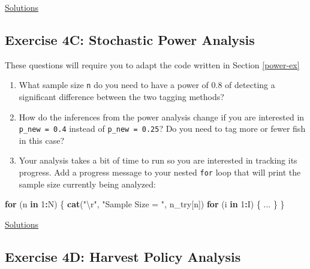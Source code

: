 \documentclass[]{book}
\newenvironment{Shaded}{\begin{snugshade}}{\end{snugshade}}
\newcommand{\KeywordTok}[1]{\textcolor[rgb]{0.13,0.29,0.53}{\textbf{#1}}}
\newcommand{\DecValTok}[1]{\textcolor[rgb]{0.00,0.00,0.81}{#1}}
\newcommand{\CharTok}[1]{\textcolor[rgb]{0.31,0.60,0.02}{#1}}
\newcommand{\StringTok}[1]{\textcolor[rgb]{0.31,0.60,0.02}{#1}}
\newcommand{\ControlFlowTok}[1]{\textcolor[rgb]{0.13,0.29,0.53}{\textbf{#1}}}
\newcommand{\OperatorTok}[1]{\textcolor[rgb]{0.81,0.36,0.00}{\textbf{#1}}}
\newcommand{\NormalTok}[1]{#1}
\providecommand{\tightlist}{%
  \setlength{\itemsep}{0pt}\setlength{\parskip}{0pt}}
\theoremstyle{definition}
\theoremstyle{definition}
\theoremstyle{definition}
\theoremstyle{remark}
\begin{document}
\protect\hyperlink{ex4b-answers}{Solutions}

\subsection*{Exercise 4C: Stochastic Power
Analysis}\label{exercise-4c-stochastic-power-analysis}

These questions will require you to adapt the code written in Section
\ref{power-ex}

\begin{enumerate}
\def\labelenumi{\arabic{enumi}.}
\tightlist
\item
  What sample size \texttt{n} do you need to have a power of 0.8 of
  detecting a significant difference between the two tagging methods?
\item
  How do the inferences from the power analysis change if you are
  interested in \texttt{p\_new\ =\ 0.4} instead of
  \texttt{p\_new\ =\ 0.25}? Do you need to tag more or fewer fish in
  this case?
\item
  Your analysis takes a bit of time to run so you are interested in
  tracking its progress. Add a progress message to your nested
  \texttt{for} loop that will print the sample size currently being
  analyzed:
\end{enumerate}

\begin{Shaded}
\begin{Highlighting}[]
\ControlFlowTok{for}\NormalTok{ (n }\ControlFlowTok{in} \DecValTok{1}\OperatorTok{:}\NormalTok{N) \{}
  \KeywordTok{cat}\NormalTok{(}\StringTok{"}\CharTok{\textbackslash{}r}\StringTok{"}\NormalTok{, }\StringTok{"Sample Size = "}\NormalTok{, n_try[n])}
  \ControlFlowTok{for}\NormalTok{ (i }\ControlFlowTok{in} \DecValTok{1}\OperatorTok{:}\NormalTok{I) \{}
\NormalTok{    ...}
\NormalTok{  \}}
\NormalTok{\}}
\end{Highlighting}
\end{Shaded}

\protect\hyperlink{ex4c-answers}{Solutions}

\subsection*{Exercise 4D: Harvest Policy
Analysis}\label{exercise-4d-harvest-policy-analysis}
\end{document}
